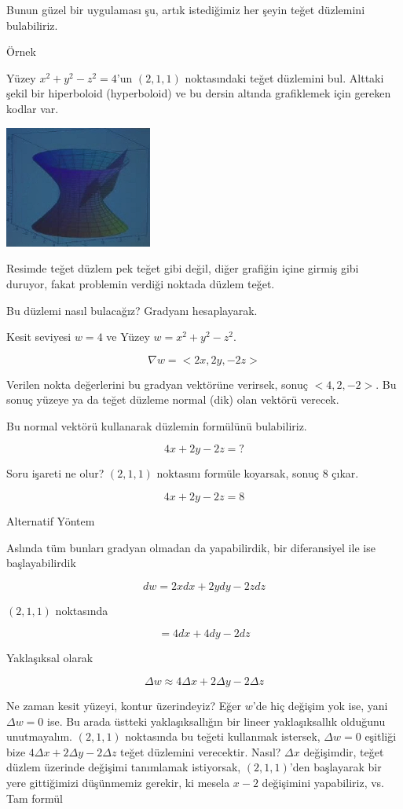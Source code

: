 \documentclass[12pt,fleqn]{article}\usepackage{../../common}
\begin{document}
Bunun güzel bir uygulaması şu, artık istediğimiz her şeyin teğet düzlemini
bulabiliriz. 

Örnek

Yüzey $x^2 + y^2 - z^2 = 4$'un $(2,1,1)$ noktasındaki teğet düzlemini
bul. Alttaki şekil bir hiperboloid (hyperboloid) ve bu dersin altında
grafiklemek için gereken kodlar var.

\includegraphics[height=4cm]{12_5.png}

Resimde teğet düzlem pek teğet gibi değil, diğer grafiğin içine girmiş gibi
duruyor, fakat problemin verdiği noktada düzlem teğet. 

Bu düzlemi nasıl bulacağız? Gradyanı hesaplayarak. 

Kesit seviyesi $w=4$ ve Yüzey $w = x^2 + y^2 - z^2$. 

$$ \nabla w = <2x, 2y, -2z> $$

Verilen nokta değerlerini bu gradyan vektörüne verirsek, sonuç
$< 4,2,-2 >$. Bu sonuç yüzeye ya da teğet düzleme normal (dik) olan 
vektörü verecek. 

Bu normal vektörü kullanarak düzlemin formülünü bulabiliriz. 

$$ 4x + 2y - 2z = ? $$

Soru işareti ne olur? $(2,1,1)$ noktasını formüle koyarsak, sonuç 8 çıkar.

$$ 4x + 2y - 2z = 8 $$

Alternatif Yöntem

Aslında tüm bunları gradyan olmadan da yapabilirdik, bir diferansiyel ile
ise başlayabilirdik

$$ dw = 2x dx + 2y dy -2z dz $$

$(2,1,1)$ noktasında

$$ = 4dx + 4dy - 2dz $$

Yaklaşıksal olarak 

$$ \Delta w \approx 4 \Delta x + 2\Delta y - 2\Delta z  $$

Ne zaman kesit yüzeyi, kontur üzerindeyiz? Eğer $w$'de hiç değişim yok ise, yani
$\Delta w = 0$ ise. Bu arada üstteki yaklaşıksallığın bir lineer yaklaşıksallık
olduğunu unutmayalım. $(2,1,1)$ noktasında bu teğeti kullanmak istersek, $\Delta
w = 0$ eşitliği bize $4 \Delta x + 2\Delta y - 2\Delta z $ teğet düzlemini
verecektir. Nasıl? $\Delta x$ değişimdir, teğet düzlem üzerinde değişimi
tanımlamak istiyorsak, $(2,1,1)$'den başlayarak bir yere gittiğimizi düşünmemiz
gerekir, ki mesela $x-2$ değişimini yapabiliriz, vs. Tam formül
\end{document}
